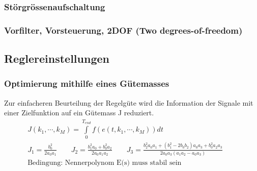 \subsubsection{Störgrössenaufschaltung}


\subsubsection{Vorfilter, Vorsteuerung, 2DOF (Two degrees-of-freedom)}


\subsection{Reglereinstellungen}


\subsubsection{Optimierung mithilfe eines Gütemasses}

Zur einfacheren Beurteilung der Regelgüte wird die Information der Signale mit einer Zielfunktion auf ein
Gütemass J reduziert.
\begin{eqnarray}
J(k_1,\cdots,k_M)=\int\limits_{0}^{T_{end}}f(e(t,k_1,\cdots,k_M))dt\\
J_1=\frac{b_0^2}{2a_0a_1} \qquad J_2=\frac{b_1^2a_0+b_0^2a_2}{2a_0a_1a_2} \qquad J_3=\frac{b_2^2a_0a_1+(b_1^2-2b_0b_2)a_0a_3+b_0^2a_2a_3}{2a_0a_3(a_1a_2-a_0a_3)} \qquad  \\
\text{Bedingung: Nennerpolynom E(s) muss stabil sein}
\end{eqnarray}

